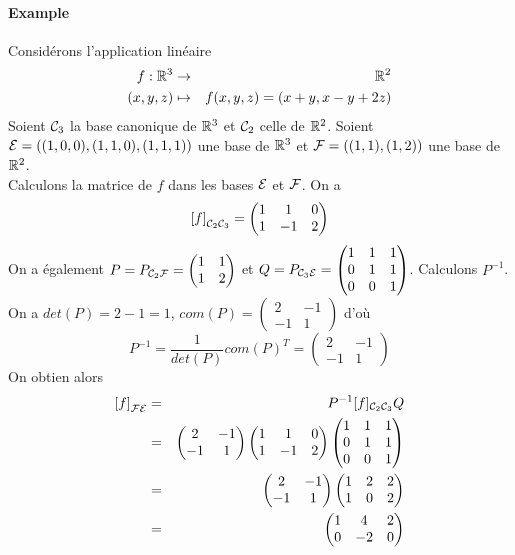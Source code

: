 \paragraph{Example} Considérons l'application linéaire
\begin{eqnarray*}
  f: \mathbb{R}^3 &\rightarrow& \mathbb{R}^2 \\
  (x, y, z) &\mapsto& f(x, y, z) = (x + y, x - y + 2z)
\end{eqnarray*}
Soient $\mathcal{C}_3$ la base canonique de $\mathbb{R}^3$ et $\mathcal{C}_2$ celle de $\mathbb{R}^2$. Soient $\mathcal{E} = ((1, 0, 0), (1, 1, 0), (1, 1, 1))$ une base de $\mathbb{R}^3$ et $\mathcal{F} = ((1, 1), (1, 2))$ une base de $\mathbb{R}^2$. \\
Calculons la matrice de $f$ dans les bases $\mathcal{E}$ et $\mathcal{F}$. On a
$$\left[f\right]_{\mathcal{C}_2 \mathcal{C}_3} = 
\begin{pmatrix}
  1 & 1  & 0 \\
  1 & -1 & 2
\end{pmatrix}$$
On a également $P = P_{\mathcal{C}_2 \mathcal{F}} = \begin{pmatrix} 1 & 1 \\ 1 & 2 \end{pmatrix}$ et $Q = P_{\mathcal{C}_3 \mathcal{E}} = \begin{pmatrix} 1 & 1 & 1 \\ 0 & 1 & 1 \\ 0 & 0 & 1 \end{pmatrix}$. Calculons $P^{-1}$. On a $det(P) = 2 - 1 = 1$, $com(P) = \begin{pmatrix} 2 & -1 \\ -1 & 1 \end{pmatrix}$ d'où
$$P^{-1} = \frac{1}{det(P)} com(P)^{T} = \begin{pmatrix} 2 & -1 \\ -1 & 1 \end{pmatrix}$$
On obtien alors
\begin{eqnarray*}
  \left[f\right]_{\mathcal{F} \mathcal{E}} &=& P^{-1}  [f]_{\mathcal{C}_2 \mathcal{C}_3} Q \\
    &=& \begin{pmatrix} 2 & -1 \\ -1 & 1 \end{pmatrix} \begin{pmatrix} 1 & 1 & 0 \\ 1 & -1 & 2 \end{pmatrix} \begin{pmatrix} 1 & 1 & 1 \\ 0 & 1 & 1 \\ 0 & 0 & 1 \end{pmatrix} \\
    &=& \begin{pmatrix} 2 & -1 \\ -1 & 1 \end{pmatrix} \begin{pmatrix} 1 & 2 & 2 \\ 1 & 0 & 2 \end{pmatrix} \\
    &=& \begin{pmatrix} 1 & 4 & 2 \\ 0 & -2 & 0 \end{pmatrix}
\end{eqnarray*}

